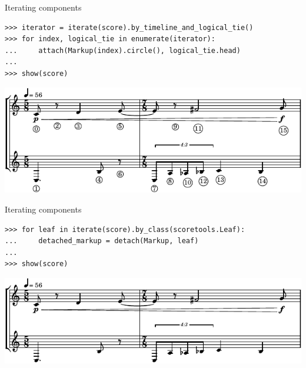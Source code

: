 \begin{frame}[fragile]{Iterating components}

\begin{abjadbookoutput}
\begin{singlespacing}
\vspace{-0.5\baselineskip}
\begin{verbatim}
>>> iterator = iterate(score).by_timeline_and_logical_tie()
>>> for index, logical_tie in enumerate(iterator):
...     attach(Markup(index).circle(), logical_tie.head)
...
>>> show(score)
\end{verbatim}
\noindent\includegraphics[max width=\textwidth,]{assets/lilypond-e9e234b6cc72814df926851d4e073617.pdf}
\end{singlespacing}
\end{abjadbookoutput}

\end{frame}

\begin{frame}[fragile]{Iterating components}

\begin{abjadbookoutput}
\begin{singlespacing}
\vspace{-0.5\baselineskip}
\begin{verbatim}
>>> for leaf in iterate(score).by_class(scoretools.Leaf):
...     detached_markup = detach(Markup, leaf)
...
>>> show(score)
\end{verbatim}
\noindent\includegraphics[max width=\textwidth,]{assets/lilypond-93a2b38978bbd78fc9e299d85430127a.pdf}
\end{singlespacing}
\end{abjadbookoutput}

\end{frame}

